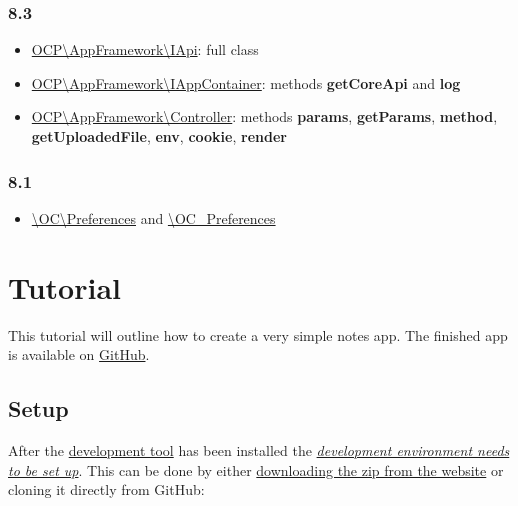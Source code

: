 \documentclass[letterpaper,10pt,english]{sphinxmanual}
\begin{document}
\subsubsection{8.3}
\label{app/changelog:id4}\begin{itemize}
\item {} 
\href{https://github.com/owncloud/core/blob/d59c4e832fea87d03d199a3211186a47fd252c32/lib/public/appframework/iapi.php}{OCP\textbackslash{}AppFramework\textbackslash{}IApi}: full class

\item {} 
\href{https://github.com/owncloud/core/blob/d59c4e832fea87d03d199a3211186a47fd252c32/lib/public/appframework/iappcontainer.php}{OCP\textbackslash{}AppFramework\textbackslash{}IAppContainer}: methods \textbf{getCoreApi} and \textbf{log}

\item {} 
\href{https://github.com/owncloud/core/blob/d59c4e832fea87d03d199a3211186a47fd252c32/lib/public/appframework/controller.php}{OCP\textbackslash{}AppFramework\textbackslash{}Controller}: methods \textbf{params}, \textbf{getParams}, \textbf{method}, \textbf{getUploadedFile}, \textbf{env}, \textbf{cookie}, \textbf{render}

\end{itemize}


\subsubsection{8.1}
\label{app/changelog:id5}\begin{itemize}
\item {} 
\href{https://github.com/owncloud/core/commit/909a53e087b7815ba9cd814eb6c22845ef5b48c7}{\textbackslash{}OC\textbackslash{}Preferences} and \href{https://github.com/owncloud/core/commit/4df7c0a1ed52ed1922116686cb5ad8da2544c997}{\textbackslash{}OC\_Preferences}

\end{itemize}


\section{Tutorial}
\label{app/tutorial::doc}\label{app/tutorial:tutorial}
This tutorial will outline how to create a very simple notes app. The finished app is available on \href{https://github.com/owncloud/app-tutorial\#tutorial}{GitHub}.


\subsection{Setup}
\label{app/tutorial:setup}
After the \href{https://github.com/owncloud/ocdev/blob/master/README.rst\#installation}{development tool} has been installed the {\hyperref[general/devenv::doc]{\emph{development environment needs to be set up}}}. This can be done by either \href{https://owncloud.org/install/}{downloading the zip from the website} or cloning it directly from GitHub:
\end{document}
